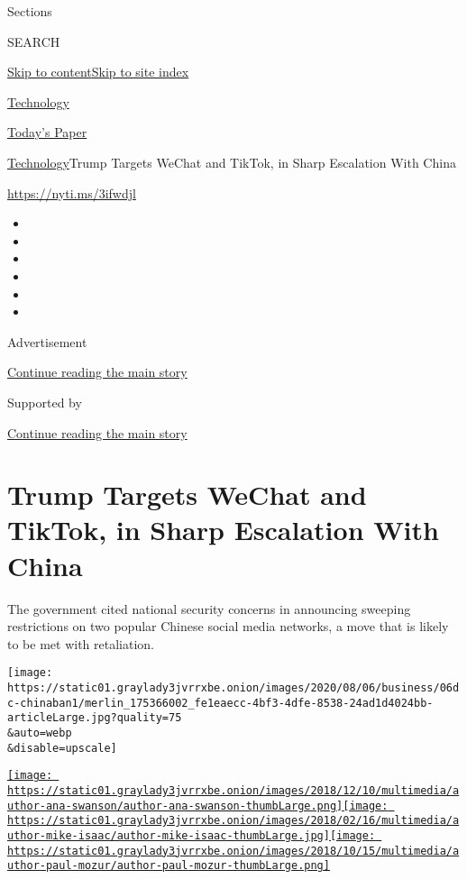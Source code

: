 Sections

SEARCH

\protect\hyperlink{site-content}{Skip to
content}\protect\hyperlink{site-index}{Skip to site index}

\href{https://www.nytimes3xbfgragh.onion/section/technology}{Technology}

\href{https://myaccount.nytimes3xbfgragh.onion/auth/login?response_type=cookie\&client_id=vi}{}

\href{https://www.nytimes3xbfgragh.onion/section/todayspaper}{Today's
Paper}

\href{/section/technology}{Technology}\textbar{}Trump Targets WeChat and
TikTok, in Sharp Escalation With China

\url{https://nyti.ms/3ifwdjl}

\begin{itemize}
\item
\item
\item
\item
\item
\item
\end{itemize}

Advertisement

\protect\hyperlink{after-top}{Continue reading the main story}

Supported by

\protect\hyperlink{after-sponsor}{Continue reading the main story}

\hypertarget{trump-targets-wechat-and-tiktok-in-sharp-escalation-with-china}{%
\section{Trump Targets WeChat and TikTok, in Sharp Escalation With
China}\label{trump-targets-wechat-and-tiktok-in-sharp-escalation-with-china}}

The government cited national security concerns in announcing sweeping
restrictions on two popular Chinese social media networks, a move that
is likely to be met with retaliation.

\texttt{[image: https://static01.graylady3jvrrxbe.onion/images/2020/08/06/business/06dc-chinaban1/merlin\_175366002\_fe1eaecc-4bf3-4dfe-8538-24ad1d4024bb-articleLarge.jpg?quality=75\\\&auto=webp\\\&disable=upscale]}

\href{https://www.nytimes3xbfgragh.onion/by/ana-swanson}{\texttt{[image: https://static01.graylady3jvrrxbe.onion/images/2018/12/10/multimedia/author-ana-swanson/author-ana-swanson-thumbLarge.png]}}\href{https://www.nytimes3xbfgragh.onion/by/mike-isaac}{\texttt{[image: https://static01.graylady3jvrrxbe.onion/images/2018/02/16/multimedia/author-mike-isaac/author-mike-isaac-thumbLarge.jpg]}}\href{https://www.nytimes3xbfgragh.onion/by/paul-mozur}{\texttt{[image: https://static01.graylady3jvrrxbe.onion/images/2018/10/15/multimedia/author-paul-mozur/author-paul-mozur-thumbLarge.png]}}

